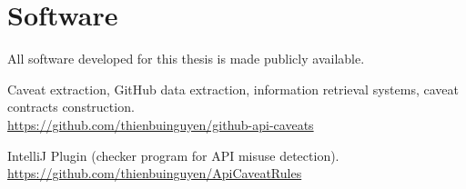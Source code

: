 \chapter*{Software}
All software developed for this thesis is made publicly available. \bigbreak

\noindent
Caveat extraction, GitHub data extraction, information retrieval systems, caveat contracts construction.\\
\url{https://github.com/thienbuinguyen/github-api-caveats}
\bigbreak

\noindent
IntelliJ Plugin (checker program for API misuse detection).\\
\url{https://github.com/thienbuinguyen/ApiCaveatRules}
